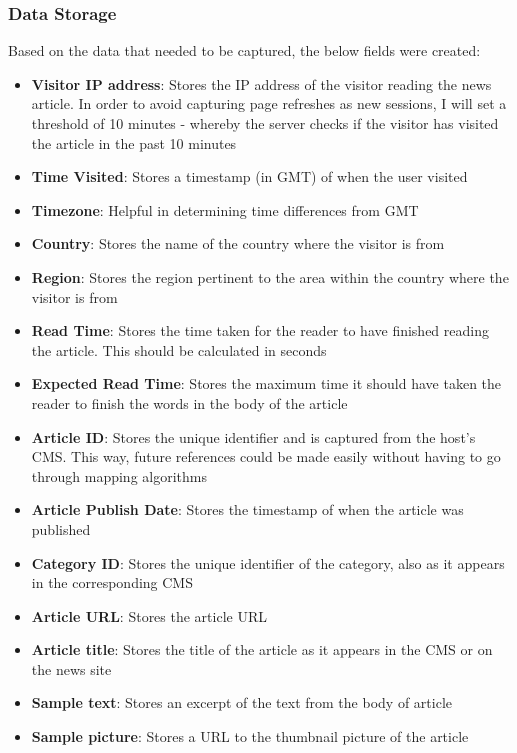 \documentclass[12pt]{article}
\begin{document}
\subsubsection{Data Storage}
Based on the data that needed to be captured, the below fields were created:
\begin{itemize}
\item \textbf{Visitor IP address}: Stores the IP address of the visitor reading the news article. In order to avoid capturing page refreshes as new sessions, I will set a threshold of 10 minutes - whereby the server checks if the visitor has visited the article in the past 10 minutes
\item \textbf{Time Visited}: Stores a timestamp (in GMT) of when the user visited 
\item \textbf{Timezone}: Helpful in determining time differences from GMT
\item \textbf{Country}: Stores the name of the country where the visitor is from
\item \textbf{Region}: Stores the region pertinent to the area within the country where the visitor is from
\item \textbf{Read Time}: Stores the time taken for the reader to have finished reading the article. This should be calculated in seconds
\item \textbf{Expected Read Time}: Stores the maximum time it should have taken the reader to finish the words in the body of the article
\item \textbf{Article ID}: Stores the unique identifier and is captured from the host's CMS. This way, future references could be made easily without having to go through mapping algorithms
\item \textbf{Article Publish Date}: Stores the timestamp of when the article was published
\item \textbf{Category ID}: Stores the unique identifier of the category, also as it appears in the corresponding CMS
\item \textbf{Article URL}: Stores the article URL 
\item \textbf{Article title}: Stores the title of the article as it appears in the CMS or on the news site
\item \textbf{Sample text}: Stores an excerpt of the text from the body of article
\item \textbf{Sample picture}: Stores a URL to the thumbnail picture of the article

\end{itemize}
\end{document}
